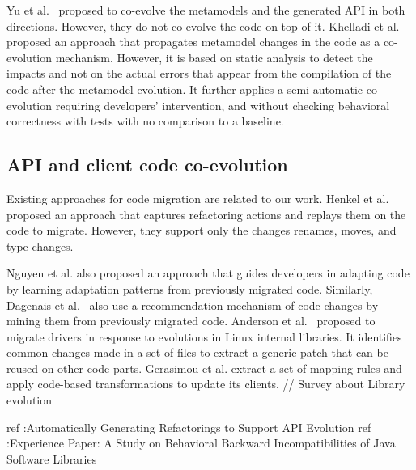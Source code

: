  Yu et al.~\cite{yu2012maintaining} proposed to co-evolve the metamodels and the generated API in both directions. However, they do not co-evolve the code on top of it.%
 Khelladi et al.~\cite{Khelladi2020} proposed an approach that propagates metamodel changes in the code as a co-evolution mechanism. However, it is based on static analysis to detect the impacts and not on the actual errors that appear from the compilation of the code after the metamodel evolution. It further applies a semi-automatic co-evolution requiring developers' intervention, and without checking behavioral correctness with tests with no comparison to a baseline. 
 
 
 \subsection{API and client code co-evolution}
 \label{API_evolution}
 
 
 Existing approaches for code migration are related to our work.%
  Henkel et al.~\cite{henkel2005catchup} proposed an approach that captures refactoring actions and replays them on the code to migrate. However, they support only the changes renames, moves, and type changes. 
 
 Nguyen et al. \cite{nguyen2010graph} also proposed an approach that guides developers in adapting code by learning adaptation patterns from previously migrated code. Similarly, Dagenais et al.~\cite{dagenais2011recommending,5070565,10.1145/1932682.1869486} also use a recommendation mechanism of code changes by mining them from previously migrated code. 
 Anderson et al.~\cite{andersen2010generic} proposed to migrate drivers in response to evolutions in Linux internal libraries. It identifies common changes made in a set of files to extract a generic patch that can be reused on other code parts. Gerasimou et al. \cite{10.1145/3194793.3194798} extract a set of mapping rules and apply code-based transformations to update its clients.
 // Survey about Library evolution \cite{10043250}
 
 ref :Automatically Generating Refactorings to Support API Evolution
 ref :Experience Paper: A Study on Behavioral Backward Incompatibilities of Java Software Libraries
 
